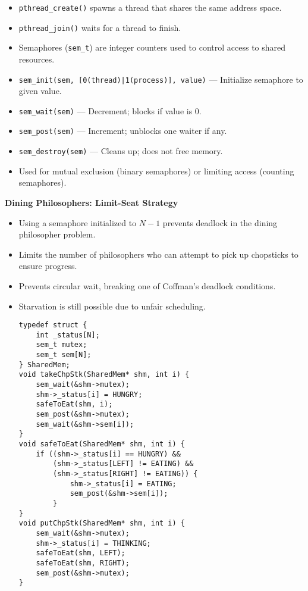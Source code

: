 \documentclass[8pt,twocolumn]{article}
\begin{document}
\begin{itemize}[leftmargin=2em]
    \setlength{\itemsep}{0pt} %
    \setlength{\parskip}{0pt}
    \item \texttt{pthread\_create()} spawns a thread that shares the same address space.
    \item \texttt{pthread\_join()} waits for a thread to finish.
    \item Semaphores (\texttt{sem\_t}) are integer counters used to control access to shared resources.
    \item \texttt{sem\_init(sem, [0(thread)|1(process)], value)} — Initialize semaphore to given value.
    \item \texttt{sem\_wait(sem)} — Decrement; blocks if value is 0.
    \item \texttt{sem\_post(sem)} — Increment; unblocks one waiter if any.
    \item \texttt{sem\_destroy(sem)} — Cleans up; does not free memory.
    \item Used for mutual exclusion (binary semaphores) or limiting access (counting semaphores).
\end{itemize}
\vspace{-0.6em}
\textbf{Dining Philosophers: Limit-Seat Strategy}
\vspace{-0.6em}
\begin{itemize}
    \setlength{\itemsep}{0pt} %
    \setlength{\parskip}{0pt}
    \item Using a semaphore initialized to \( N - 1 \) prevents deadlock in the dining philosopher problem.
    \item Limits the number of philosophers who can attempt to pick up chopsticks to ensure progress.
    \item Prevents circular wait, breaking one of Coffman’s deadlock conditions.
    \item Starvation is still possible due to unfair scheduling.
\vspace{-0.6em}
\begin{lstlisting}
typedef struct {
    int _status[N];
    sem_t mutex;
    sem_t sem[N]; 
} SharedMem;
void takeChpStk(SharedMem* shm, int i) {
    sem_wait(&shm->mutex);
    shm->_status[i] = HUNGRY;
    safeToEat(shm, i);
    sem_post(&shm->mutex);
    sem_wait(&shm->sem[i]);
}
void safeToEat(SharedMem* shm, int i) {
    if ((shm->_status[i] == HUNGRY) &&
        (shm->_status[LEFT] != EATING) &&
        (shm->_status[RIGHT] != EATING)) {
            shm->_status[i] = EATING;
            sem_post(&shm->sem[i]);
        }
} 
void putChpStk(SharedMem* shm, int i) {
    sem_wait(&shm->mutex);
    shm->_status[i] = THINKING;
    safeToEat(shm, LEFT);
    safeToEat(shm, RIGHT);
    sem_post(&shm->mutex);
}
\end{lstlisting}
\vspace{-1.5em}
\end{itemize}
\end{document}
